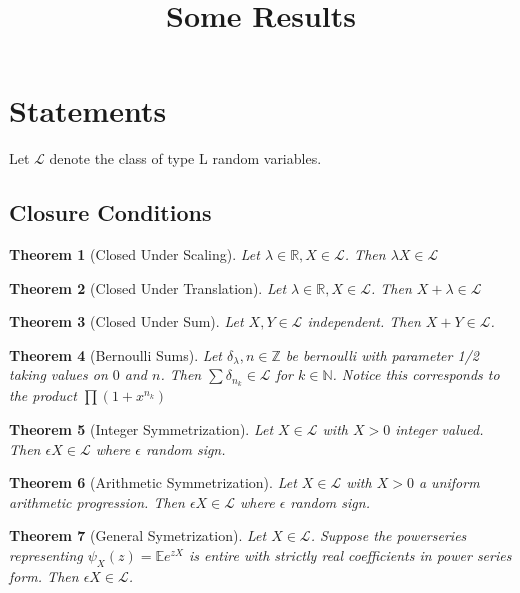 \documentclass[10pt]{article}
\title{\vspace{-3em}Some Results}
\newcommand{\E}{\mathbb{E}}
\newcommand{\1}{\textbf{1}}
\newcommand{\R}{\mathbb{R}}
\newcommand{\Z}{\mathbb{Z}}
\newcommand{\N}{\mathbb{N}}
\newcommand{\lL}{\mathcal{L}}
\newtheorem{theorem}{Theorem}
\theoremstyle{remark}
\theoremstyle{definition}
\begin{document}
\section{Statements}

Let $\lL$ denote the class of type L random variables.


\subsection{Closure Conditions}

\begin{theorem}[Closed Under Scaling] \label{them:MULT}
	Let $\lambda \in \R, X \in \lL$. Then $\lambda X \in \lL$
\end{theorem}

\begin{theorem}[Closed Under Translation] \label{them:SHIFT}
	Let $\lambda \in \R, X \in \lL$. Then $X+\lambda \in \lL$
\end{theorem}

\begin{theorem}[Closed Under Sum] \label{them:SUM}
	Let $X,Y \in \lL$ independent. Then $X+Y \in \lL$.
\end{theorem}

\begin{theorem}[Bernoulli Sums] \label{them:BER}
	Let $\delta_{\lambda}, n \in \Z$ be bernoulli with parameter 1/2 taking values on $0$ and $n$. Then $\sum \delta_{n_k} \in \lL$ for $k \in \N$. Notice this corresponds to the product $\prod (1+x^{n_k})$ 
\end{theorem}

\begin{theorem}[Integer Symmetrization] \label{them:ISYM}
	Let $X \in \lL$ with $X > 0$ integer valued. Then $\epsilon X \in \lL$ where $\epsilon$ random sign.
\end{theorem}

\begin{theorem}[Arithmetic Symmetrization] \label{them:ASYM}
	Let $X \in \lL$ with $X > 0$ a uniform arithmetic progression. Then $\epsilon X \in \lL$ where $\epsilon$ random sign.
\end{theorem}

\begin{theorem}[General Symetrization] \label{them:GSYM}
	Let $X \in \lL$. Suppose the powerseries representing $\psi_X(z) = \E e^{z X}$ is entire with strictly real coefficients in power series form. Then $\epsilon X \in \lL$.
\end{theorem}
\end{document}
